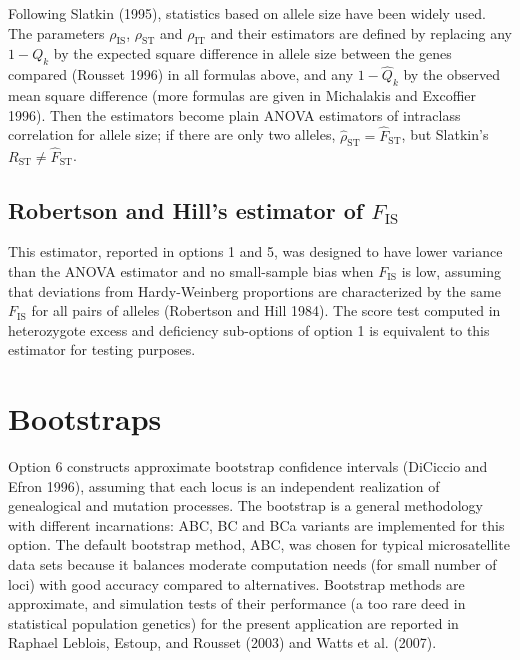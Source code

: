 \documentclass[
  12pt,
]{book}
\begin{document}
Following Slatkin (1995), statistics based on allele size have been widely used. The parameters \(\rho_\mathrm{IS}\), \(\rho_\mathrm{ST}\) and \(\rho_\mathrm{IT}\) and their estimators are defined by replacing any \(1-Q_k\) by the expected square difference in allele size between the genes compared (Rousset 1996) in all formulas above, and any \(1-\hat{Q}_k\) by the observed mean square difference (more formulas are given in Michalakis and Excoffier 1996). Then the estimators become plain ANOVA estimators of intraclass correlation for allele size; if there are only two alleles, \(\hat{\rho}_{\mathrm{ST}}=\hat{F}_{\mathrm{ST}}\), but Slatkin's \(R_{\mathrm{ST}}\neq\hat{F}_{\mathrm{ST}}\).

\hypertarget{robertson-and-hills-estimator-of-f_mathrmis}{%
\subsection{\texorpdfstring{Robertson and Hill's estimator of \(F_\mathrm{IS}\)}{Robertson and Hill's estimator of F\_\textbackslash mathrm\{IS\}}}\label{robertson-and-hills-estimator-of-f_mathrmis}}

This estimator, reported in options 1 and 5, was designed to have lower variance than the ANOVA estimator and no small-sample bias when \(F_\mathrm{IS}\) is low, assuming that deviations from Hardy-Weinberg proportions are characterized by the same \(F_\mathrm{IS}\) for all pairs of alleles (Robertson and Hill 1984). The score test computed in heterozygote excess and deficiency sub-options of option 1 is equivalent to this estimator for testing purposes.

\hypertarget{bootstraps}{%
\section{Bootstraps}\label{bootstraps}}

Option 6 constructs approximate bootstrap confidence intervals (DiCiccio and Efron 1996), assuming that each locus is an independent realization of genealogical and mutation processes. The bootstrap is a general methodology with different incarnations: ABC, BC and BCa variants are implemented for this option. The default bootstrap method, ABC, was chosen for typical microsatellite data sets because it balances moderate computation needs (for small number of loci) with good accuracy compared to alternatives. Bootstrap methods are approximate, and simulation tests of their performance (a too rare deed in statistical population genetics) for the present application are reported in Raphael Leblois, Estoup, and Rousset (2003) and Watts et al. (2007).
\end{document}
